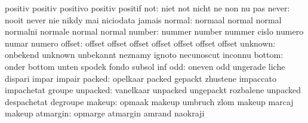                            positiv                   positiv
                           positivo                  positiv
                           positif
                      not: niet                      not
                           nicht                     ne
                           non                       nu
                           pas
                    never: nooit                     never
                           nie                       nikdy
                           mai                       niciodata
                           jamais
                   normal: normaal                   normal
                           normal                    normalni
                           normale                   normal
                           normal
                   number: nummer                    number
                           nummer                    cislo
                           numero                    numar
                           numero
                   offset: offset                    offset
                           offset                    offset
                           offset                    offset
                           offset
                  unknown: onbekend                  unknown
                           unbekannt                 neznamy
                           ignoto                    necunoscut
                           inconnu
                   bottom: onder                     bottom
                           unten                     spodek
                           fondo                     subsol
                           inf
                      odd: oneven                    odd
                           ungerade                  liche
                           dispari                   impar
                           impair
                   packed: opelkaar                  packed
                           gepackt                   zhustene
                           impaccato                 impachetat
                           groupe
                 unpacked: vanelkaar                 unpacked
                           ungepackt                 rozbalene
                           unpacked                  despachetat
                           degroupe
                   makeup: opmaak                    makeup
                           umbruch                   zlom
                           makeup                    marcaj
                           makeup
                 atmargin: opmarge                   atmargin
                           amrand                    naokraji
